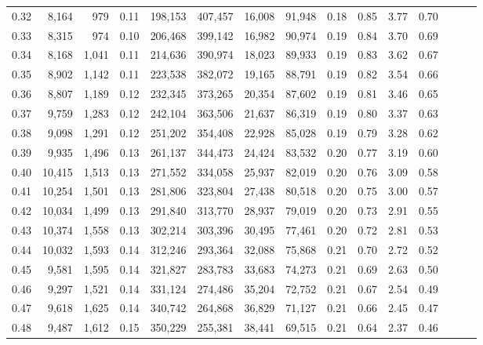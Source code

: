 \begin{tabular}{rrrrrrrrrrrrrrr}
0.32 &   8,164 &    979 &  0.11 &  198,153 &  407,457 &   16,008 &   91,948 &  0.18 &  0.85 &  3.77 &      0.70 \\
0.33 &   8,315 &    974 &  0.10 &  206,468 &  399,142 &   16,982 &   90,974 &  0.19 &  0.84 &  3.70 &      0.69 \\
0.34 &   8,168 &  1,041 &  0.11 &  214,636 &  390,974 &   18,023 &   89,933 &  0.19 &  0.83 &  3.62 &      0.67 \\
0.35 &   8,902 &  1,142 &  0.11 &  223,538 &  382,072 &   19,165 &   88,791 &  0.19 &  0.82 &  3.54 &      0.66 \\
0.36 &   8,807 &  1,189 &  0.12 &  232,345 &  373,265 &   20,354 &   87,602 &  0.19 &  0.81 &  3.46 &      0.65 \\
0.37 &   9,759 &  1,283 &  0.12 &  242,104 &  363,506 &   21,637 &   86,319 &  0.19 &  0.80 &  3.37 &      0.63 \\
0.38 &   9,098 &  1,291 &  0.12 &  251,202 &  354,408 &   22,928 &   85,028 &  0.19 &  0.79 &  3.28 &      0.62 \\
0.39 &   9,935 &  1,496 &  0.13 &  261,137 &  344,473 &   24,424 &   83,532 &  0.20 &  0.77 &  3.19 &      0.60 \\
0.40 &  10,415 &  1,513 &  0.13 &  271,552 &  334,058 &   25,937 &   82,019 &  0.20 &  0.76 &  3.09 &      0.58 \\
0.41 &  10,254 &  1,501 &  0.13 &  281,806 &  323,804 &   27,438 &   80,518 &  0.20 &  0.75 &  3.00 &      0.57 \\
0.42 &  10,034 &  1,499 &  0.13 &  291,840 &  313,770 &   28,937 &   79,019 &  0.20 &  0.73 &  2.91 &      0.55 \\
0.43 &  10,374 &  1,558 &  0.13 &  302,214 &  303,396 &   30,495 &   77,461 &  0.20 &  0.72 &  2.81 &      0.53 \\
0.44 &  10,032 &  1,593 &  0.14 &  312,246 &  293,364 &   32,088 &   75,868 &  0.21 &  0.70 &  2.72 &      0.52 \\
0.45 &   9,581 &  1,595 &  0.14 &  321,827 &  283,783 &   33,683 &   74,273 &  0.21 &  0.69 &  2.63 &      0.50 \\
0.46 &   9,297 &  1,521 &  0.14 &  331,124 &  274,486 &   35,204 &   72,752 &  0.21 &  0.67 &  2.54 &      0.49 \\
0.47 &   9,618 &  1,625 &  0.14 &  340,742 &  264,868 &   36,829 &   71,127 &  0.21 &  0.66 &  2.45 &      0.47 \\
0.48 &   9,487 &  1,612 &  0.15 &  350,229 &  255,381 &   38,441 &   69,515 &  0.21 &  0.64 &  2.37 &      0.46 \\

\end{tabular}
